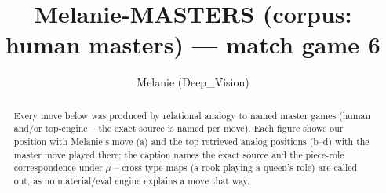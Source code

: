 \documentclass[11pt]{article}
\title{Melanie-MASTERS (corpus: human masters) — match game 6}
\author{Melanie (Deep\_Vision)}
\date{}
\begin{document}
\maketitle

\begin{abstract}Every move below was produced by relational analogy to named master games (human and/or top-engine -- the exact source is named per move). Each figure shows our position with Melanie's move (a) and the top retrieved analog positions (b--d) with the master move played there; the caption names the exact source and the piece-role correspondence under $\mu$ -- cross-type maps (a rook playing a queen's role) are called out, as no material/eval engine explains a move that way.\end{abstract}

\begin{figure}[p]\centering
\begin{subfigure}{0.46\textwidth}\centering
\resizebox{\linewidth}{!}{%
\newchessgame
\chessboard[
  setfen={r1bq1rk1/pppp1ppp/3n1b2/8/3P4/8/PPP2PPP/RNBQRBK1 b - - 2 10},
  showmover=false,
  pgfstyle=straightmove, color=movearrow, markmove={f8-e8}
]}
\caption{}
\end{subfigure}\hfill
\begin{subfigure}{0.46\textwidth}\centering
\resizebox{\linewidth}{!}{%
\newchessgame
\chessboard[
  setfen={rnbqrbk1/ppp2ppp/8/3p4/P7/3N1B2/1PPP1PPP/R1BQ1RK1 w - - 2 11},
  showmover=false,
  pgfstyle=straightmove, color=movearrow, markmove={f1-e1}
]}
\caption{}
\end{subfigure}
\\[4pt]
\begin{subfigure}{0.46\textwidth}\centering
\resizebox{\linewidth}{!}{%
\newchessgame
\chessboard[
  setfen={r1bqr1k1/pppp1ppp/3n1b2/8/3P1B2/8/PPP2PPP/RN1QRBK1 b - - 4 11},
  showmover=false,
  pgfstyle=straightmove, color=movearrow, markmove={e8-e1}
]}
\caption{}
\end{subfigure}\hfill
\begin{subfigure}{0.46\textwidth}\centering
\resizebox{\linewidth}{!}{%
\newchessgame
\chessboard[
  setfen={r1bqr1k1/pppp1ppp/3n1b2/8/3P1B2/8/PPP2PPP/RN1QRBK1 b - - 4 11},
  showmover=false,
  pgfstyle=straightmove, color=movearrow, markmove={e8-e1}
]}
\caption{}
\end{subfigure}

\end{figure}
\end{document}
